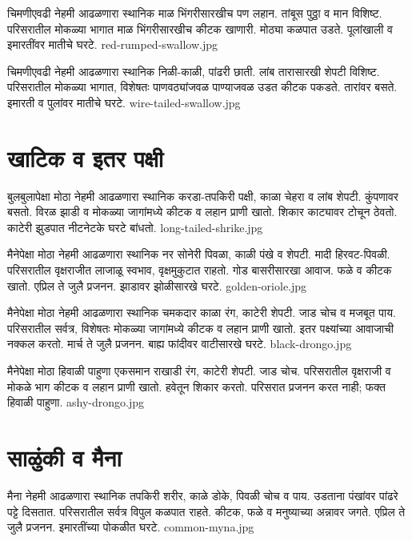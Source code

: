 \documentclass[aspectratio=169]{beamer}
\begin{document}
{चिमणीएवढी}
{नेहमी आढळणारा स्थानिक}
{माळ भिंगरीसारखीच पण लहान. तांबूस पुठ्ठा व मान विशिष्ट.}
{परिसरातील मोकळ्या भागात}
{माळ भिंगरीसारखीच कीटक खाणारी. मोठ्या कळपात उडते.}
{पूलांखाली व इमारतींवर मातीचे घरटे.}
{red-rumped-swallow.jpg}

{चिमणीएवढी}
{नेहमी आढळणारा स्थानिक}
{निळी-काळी, पांढरी छाती. लांब तारासारखी शेपटी विशिष्ट.}
{परिसरातील मोकळ्या भागात, विशेषतः पाणवठ्यांजवळ}
{पाण्याजवळ उडत कीटक पकडते. तारांवर बसते.}
{इमारती व पुलांवर मातीचे घरटे.}
{wire-tailed-swallow.jpg}

\section{खाटिक व इतर पक्षी}
{बुलबुलापेक्षा मोठा}
{नेहमी आढळणारा स्थानिक}
{करडा-तपकिरी पक्षी, काळा चेहरा व लांब शेपटी. कुंपणावर बसतो.}
{विरळ झाडी व मोकळ्या जागांमध्ये}
{कीटक व लहान प्राणी खातो. शिकार काट्यावर टोचून ठेवतो.}
{काटेरी झुडपात नीटनेटके घरटे बांधतो.}
{long-tailed-shrike.jpg}

{मैनेपेक्षा मोठा}
{नेहमी आढळणारा स्थानिक}
{नर सोनेरी पिवळा, काळी पंखे व शेपटी. मादी हिरवट-पिवळी.}
{परिसरातील वृक्षराजीत}
{लाजाळू स्वभाव, वृक्षमुकुटात राहतो. गोड बासरीसारखा आवाज. फळे व कीटक खातो.}
{एप्रिल ते जुलै प्रजनन. झाडावर झोळीसारखे घरटे.}
{golden-oriole.jpg}

{मैनेपेक्षा मोठा}
{नेहमी आढळणारा स्थानिक}
{चमकदार काळा रंग, काटेरी शेपटी. जाड चोच व मजबूत पाय.}
{परिसरातील सर्वत्र, विशेषतः मोकळ्या जागांमध्ये}
{कीटक व लहान प्राणी खातो. इतर पक्ष्यांच्या आवाजाची नक्कल करतो.}
{मार्च ते जुलै प्रजनन. बाह्य फांदीवर वाटीसारखे घरटे.}
{black-drongo.jpg}

{मैनेपेक्षा मोठा}
{हिवाळी पाहुणा}
{एकसमान राखाडी रंग, काटेरी शेपटी. जाड चोच.}
{परिसरातील वृक्षराजी व मोकळे भाग}
{कीटक व लहान प्राणी खातो. हवेतून शिकार करतो.}
{परिसरात प्रजनन करत नाही; फक्त हिवाळी पाहुणा.}
{ashy-drongo.jpg}

\section{साळुंकी व मैना}
{मैना}
{नेहमी आढळणारा स्थानिक}
{तपकिरी शरीर, काळे डोके, पिवळी चोच व पाय. उडताना पंखांवर पांढरे पट्टे दिसतात.}
{परिसरातील सर्वत्र विपुल}
{कळपात राहते. कीटक, फळे व मनुष्याच्या अन्नावर जगते.}
{एप्रिल ते जुलै प्रजनन. इमारतींच्या पोकळीत घरटे.}
{common-myna.jpg}
\end{document}

